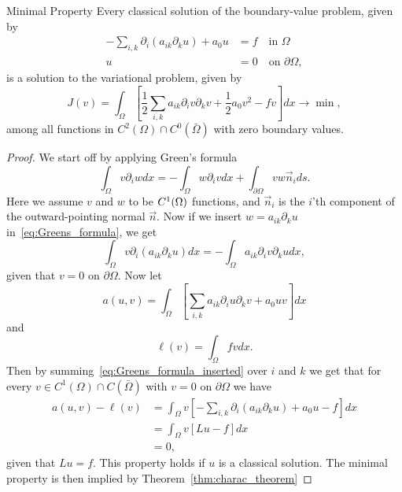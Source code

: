\begin{thmx}{Minimal Property}
    Every classical solution of the boundary-value problem, given by
\begin{align}
    -\sum_{i,k} \partial_i (a_{ik}\partial_k u) + a_0 u &= f \quad \text{in } \Omega  \\
    u &= 0 \quad \text{on } \partial \Omega,
\end{align}
    is a solution to the variational problem, given by
    \[
        J(v)=\int_\Omega \left [\frac{1}{2}\sum_{i,k} a_{ik} \partial_i v\partial_k v + \frac{1}{2} a_0 v^2 -fv\right ]dx \longrightarrow \min,
    \]
    among all functions in $C^2(\Omega)\cap C^0(\bar{\Omega})$ with zero boundary values. 
\end{thmx}
\begin{proof}
    We start off by applying Green's formula
    \begin{equation}
    \label{eq:Greens_formula}
        \int_\Omega v\partial_i w dx = -\int_\Omega w \partial_i v dx + \int_{\partial \Omega} v w \vec{n}_i ds.
    \end{equation}
    Here we assume $v$ and $w$ to be $C^1(\Omega)$ functions, and $\vec{n}_i$ is the $i$'th component of the outward-pointing normal $\vec{n}$.
    Now if we insert $w=a_{ik}\partial_k u$ in~\eqref{eq:Greens_formula}, we get
    \begin{equation}
    \label{eq:Greens_formula_inserted}
        \int_\Omega v\partial_i (a_{ik} \partial_k u) dx = -\int_\Omega a_{ik} \partial_i v\partial_k u dx,
    \end{equation}
    given that $v=0$ on $\partial \Omega$.
    Now let 
    \begin{equation}
    \label{eq:a(u,v)}
        a(u,v) = \int_\Omega \left[\sum_{i,k} a_{ik} \partial_i u \partial_k v +a_0 uv \right]dx
    \end{equation}
    and
    \begin{equation}
    \label{eq:l(v)}
        \ell(v) = \int_\Omega fv dx.
    \end{equation}
    Then by summing~\eqref{eq:Greens_formula_inserted} over $i$ and $k$ we get that for every $v\in C^1(\Omega) \cap C(\bar{\Omega})$ with $v=0$ on $\partial \Omega$ we have
    \begin{align}
        a(u,v) - \ell(v) &= \int_\Omega v\left[ -\sum_{i,k} \partial_i (a_{ik} \partial_k u) + a_0 u - f \right] dx \label{eq:min_prop_variational_problem}\\
        &= \int_\Omega v [Lu - f] dx \nonumber \\
        &= 0, \nonumber
    \end{align}
    given that $Lu = f$. This property holds if $u$ is a classical solution.
     The minimal property is then implied by Theorem~\ref{thm:charac_theorem}
\end{proof}
